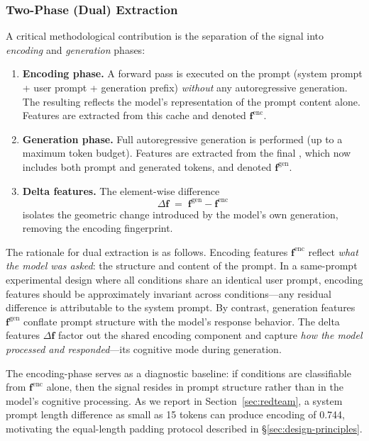 \subsubsection{Two-Phase (Dual) Extraction}
\label{sec:dual-extraction}

A critical methodological contribution is the separation of the \kvcache signal into \emph{encoding} and \emph{generation} phases:

\begin{enumerate}[leftmargin=2em]
  \item \textbf{Encoding phase.} A forward pass is executed on the prompt (system prompt + user prompt + generation prefix) \emph{without} any autoregressive generation.
  The resulting \kvcache reflects the model's representation of the prompt content alone.
  Features are extracted from this cache and denoted $\mathbf{f}^{\mathrm{enc}}$.

  \item \textbf{Generation phase.} Full autoregressive generation is performed (up to a maximum token budget).
  Features are extracted from the final \kvcache, which now includes both prompt and generated tokens, and denoted $\mathbf{f}^{\mathrm{gen}}$.

  \item \textbf{Delta features.} The element-wise difference
  \begin{equation}
    \Delta\mathbf{f} \;=\; \mathbf{f}^{\mathrm{gen}} - \mathbf{f}^{\mathrm{enc}}
    \label{eq:delta}
  \end{equation}
  isolates the geometric change introduced by the model's own generation, removing the encoding fingerprint.
\end{enumerate}

The rationale for dual extraction is as follows.
Encoding features $\mathbf{f}^{\mathrm{enc}}$ reflect \emph{what the model was asked}: the structure and content of the prompt.
In a same-prompt experimental design where all conditions share an identical user prompt, encoding features should be approximately invariant across conditions---any residual difference is attributable to the system prompt.
By contrast, generation features $\mathbf{f}^{\mathrm{gen}}$ conflate prompt structure with the model's response behavior.
The delta features $\Delta\mathbf{f}$ factor out the shared encoding component and capture \emph{how the model processed and responded}---its cognitive mode during generation.

The encoding-phase \auroc serves as a diagnostic baseline: if conditions are classifiable from $\mathbf{f}^{\mathrm{enc}}$ alone, then the signal resides in prompt structure rather than in the model's cognitive processing.
As we report in Section~\ref{sec:redteam}, a system prompt length difference as small as 15 tokens can produce encoding \auroc of 0.744, motivating the equal-length padding protocol described in \S\ref{sec:design-principles}.

